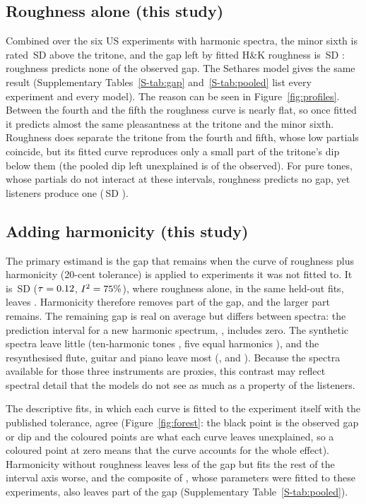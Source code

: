 \documentclass[11pt,a4paper]{article}
\newcommand{\HK}{H\&K}
\newcommand{\SDu}{\,SD}
\begin{document}
\subsection{Roughness alone (this study)}
\label{sec:roughness}
Combined over the six US experiments with harmonic spectra, the minor sixth is rated
\poolGapObsHarm\SDu{} \poolGapObsHarmCI{} above the tritone, and the gap left by fitted \HK{}
roughness is \poolGapHKHarm\SDu{} \poolGapHKHarmCI: roughness predicts none of the observed
gap. The Sethares model gives the same result (Supplementary Tables~\ref{S-tab:gap}
and~\ref{S-tab:pooled} list every experiment and every model). The reason can be seen in
Figure~\ref{fig:profiles}. Between the fourth and the fifth the roughness curve is nearly
flat, so once fitted it predicts almost the same pleasantness at the tritone and the minor
sixth. Roughness does separate the tritone from the fourth and fifth, whose low partials
coincide, but its fitted curve reproduces only a small part of the tritone's dip below them
(the pooled dip left unexplained is \poolDipHKHarm{} of the \poolDipObsHarm{} observed). For
pure tones, whose partials do not interact at these intervals, roughness predicts no gap, yet
listeners produce one (\gapObsPure\SDu{} \gapObsPureCI).

\subsection{Adding harmonicity (this study)}
\label{sec:harmonicity}
The primary estimand is the gap that remains when the curve of roughness plus harmonicity
(20-cent tolerance) is applied to experiments it was not fitted to. It is \primGap\SDu{}
\primGapCI{} ($\tau=0.12$, $I^2=75\%$), where roughness alone, in the same
held-out fits, leaves \hcGapHKheld. Harmonicity therefore removes part of the gap, and the
larger part remains. The remaining gap is real on average but differs between spectra: the
prediction interval for a new harmonic spectrum, \primGapPI, includes zero. The synthetic
spectra leave little (ten-harmonic tones \primHarm, five equal harmonics \primEqfive), and
the resynthesised flute, guitar and piano leave most (\primFlute, \primGuitar{} and
\primPiano). Because the spectra available for those three instruments are proxies, this
contrast may reflect spectral detail that the models do not see as much as a property of the
listeners.

The descriptive fits, in which each curve is fitted to the experiment itself with the
published tolerance, agree (Figure~\ref{fig:forest}: the black point is the observed gap or
dip and the coloured points are what each curve leaves unexplained, so a coloured point at
zero means that the curve accounts for the whole effect). Harmonicity without roughness
leaves less of the gap but fits the rest of the interval axis worse, and the composite of
\citet{marjieh2024}, whose parameters were fitted to these experiments, also leaves part of
the gap (Supplementary Table~\ref{S-tab:pooled}).
\end{document}
